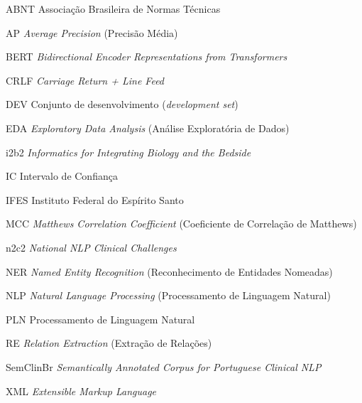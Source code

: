 \begin{siglas}
  \item[ABNT]      Associação Brasileira de Normas Técnicas
  \item[AP]        \textit{Average Precision} (Precisão Média)
  \item[BERT]      \textit{Bidirectional Encoder Representations from Transformers}
  \item[CRLF]      \textit{Carriage Return + Line Feed}
  \item[DEV]       Conjunto de desenvolvimento (\textit{development set})
  \item[EDA]       \textit{Exploratory Data Analysis} (Análise Exploratória de Dados)
  \item[i2b2]      \textit{Informatics for Integrating Biology and the Bedside}
  \item[IC]        Intervalo de Confiança
  \item[IFES]      Instituto Federal do Espírito Santo
  \item[MCC]       \textit{Matthews Correlation Coefficient} (Coeficiente de Correlação de Matthews)
  \item[n2c2]      \textit{National NLP Clinical Challenges}
  \item[NER]       \textit{Named Entity Recognition} (Reconhecimento de Entidades Nomeadas)
  \item[NLP]       \textit{Natural Language Processing} (Processamento de Linguagem Natural)
  \item[PLN]       Processamento de Linguagem Natural
  \item[RE]        \textit{Relation Extraction} (Extração de Relações)
  \item[SemClinBr] \textit{Semantically Annotated Corpus for Portuguese Clinical NLP}
  \item[XML]       \textit{Extensible Markup Language}
\end{siglas}
